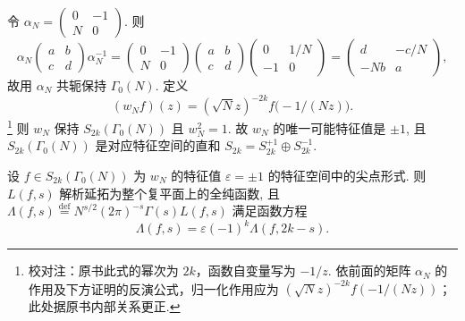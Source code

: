 令 $\alpha_N = \begin{pmatrix}0 & -1\\ N & 0\end{pmatrix}$. 则
\[
\alpha_N\begin{pmatrix}a & b\\ c & d\end{pmatrix}\alpha_N^{-1}
= \begin{pmatrix}0 & -1\\ N & 0\end{pmatrix}\begin{pmatrix}a & b\\ c & d\end{pmatrix}\begin{pmatrix}0 & 1/N\\ -1 & 0\end{pmatrix}
= \begin{pmatrix}d & -c/N\\ -Nb & a\end{pmatrix},
\]
故用 $\alpha_N$ 共轭保持 $\Gamma_0(N)$. 定义
\[
(w_N f)(z) = (\sqrt{N}z)^{-2k}f\bigl(-1/(Nz)\bigr).
\]
\footnote{校对注：原书此式的幂次为 $2k$，函数自变量写为 $-1/z$. 依前面的矩阵 $\alpha_N$ 的作用及下方证明的反演公式，归一化作用应为 $(\sqrt{N}z)^{-2k}f(-1/(Nz))$；此处据原书内部关系更正.}
则 $w_N$ 保持 $S_{2k}(\Gamma_0(N))$ 且 $w_N^2 = 1$. 故 $w_N$ 的唯一可能特征值是 $\pm 1$, 且 $S_{2k}(\Gamma_0(N))$ 是对应特征空间的直和 $S_{2k} = S_{2k}^{+1}\oplus S_{2k}^{-1}$.

\begin{theorem}[Hecke] \label{thm:5.4.4} 
设 $f\in S_{2k}(\Gamma_0(N))$ 为 $w_N$ 的特征值 $\varepsilon = \pm 1$ 的特征空间中的尖点形式. 则 $L(f, s)$ 解析延拓为整个复平面上的全纯函数, 且 $\Lambda(f, s) \overset{\text{def}}{=} N^{s/2}(2\pi)^{-s}\Gamma(s)L(f, s)$ 满足函数方程
\[
\Lambda(f, s) = \varepsilon(-1)^k\Lambda(f, 2k-s).
\]
\end{theorem}

